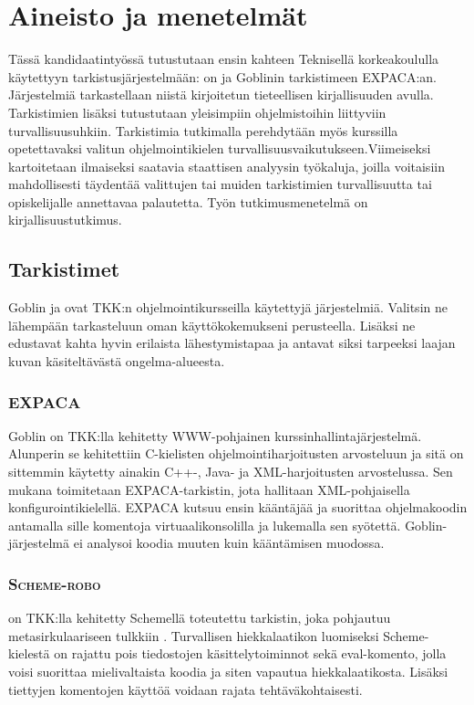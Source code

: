 \section{Aineisto ja menetelmät}
\label{sec:aineisto}

Tässä kandidaatintyössä tutustutaan ensin kahteen Teknisellä korkeakoululla
käytettyyn tarkistusjärjestelmään: {\scmrobo}on ja Goblinin tarkistimeen
EXPACA:an. Järjestelmiä tarkastellaan niistä kirjoitetun tieteellisen
kirjallisuuden avulla. Tarkistimien lisäksi tutustutaan yleisimpiin
ohjelmistoihin liittyviin turvallisuusuhkiin. Tarkistimia tutkimalla
perehdytään myös kurssilla opetettavaksi valitun ohjelmointikielen
turvallisuusvaikutukseen.Viimeiseksi kartoitetaan ilmaiseksi saatavia staattisen
analyysin työkaluja, joilla voitaisiin mahdollisesti täydentää valittujen tai
muiden tarkistimien turvallisuutta tai opiskelijalle annettavaa palautetta.
Työn tutkimusmenetelmä on kirjallisuustutkimus.

\subsection{Tarkistimet}

Goblin ja {\scmrobo} ovat TKK:n ohjelmointikursseilla käytettyjä järjestelmiä.
Valitsin ne lähempään tarkasteluun oman käyttökokemukseni
perusteella. Lisäksi ne edustavat kahta hyvin erilaista lähestymistapaa ja
antavat siksi tarpeeksi laajan kuvan käsiteltävästä ongelma-alueesta.

\subsubsection{EXPACA}

Goblin on TKK:lla kehitetty WWW-pohjainen kurssinhallintajärjestelmä.
Alunperin se kehitettiin C-kielisten ohjelmointiharjoitusten arvosteluun
ja sitä on sittemmin käytetty ainakin C++-, Java- ja XML-harjoitusten
arvostelussa. Sen mukana toimitetaan EXPACA-tarkistin, jota hallitaan
XML-pohjaisella konfigurointikielellä. EXPACA kutsuu ensin kääntäjää ja
suorittaa ohjelmakoodin antamalla sille komentoja virtuaalikonsolilla ja
lukemalla sen syötettä. Goblin-järjestelmä ei analysoi koodia muuten kuin
kääntämisen muodossa. \citep{Hiisila2005}

\subsubsection{\textsc{Scheme-robo}}

{\scmrobo} on TKK:lla kehitetty Schemellä toteutettu tarkistin, joka pohjautuu
metasirkulaariseen tulkkiin \citep{sicp}. Turvallisen hiekkalaatikon luomiseksi
Scheme-kielestä on rajattu pois tiedostojen käsittelytoiminnot
sekä eval-komento, jolla
voisi suorittaa mielivaltaista koodia ja siten vapautua hiekkalaatikosta.
Lisäksi tiettyjen komentojen käyttöä voidaan rajata tehtäväkohtaisesti.
\citep{saikkonen2001fully} \citep{liljasaikkonen}

